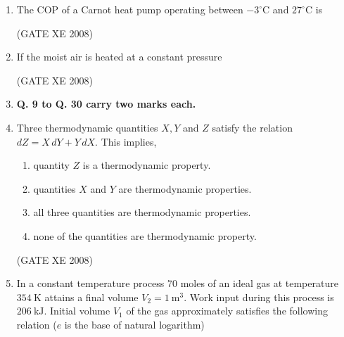 \documentclass[12pt]{article}
\begin{document}
\begin{enumerate}
\item The COP of a Carnot heat pump operating between $-3^\circ\mathrm{C}$ and $27^\circ\mathrm{C}$ is  

\begin{enumerate}
\end{enumerate}

(GATE XE 2008)

\item If the moist air is heated at a constant pressure  

\begin{enumerate}
\end{enumerate}

(GATE XE 2008)

\item[] \textbf{Q. 9 to Q. 30 carry two marks each.}

\item Three thermodynamic quantities $X, Y$ and $Z$ satisfy the relation  
$dZ = X\, dY + Y\, dX.$
This implies,  
\begin{enumerate}
\item  quantity $Z$ is a thermodynamic property.
\item  quantities $X$ and $Y$ are thermodynamic properties. 
\item  all three quantities are thermodynamic properties. 
\item  none of the quantities are thermodynamic property. 
\end{enumerate}

(GATE XE 2008)

\item In a constant temperature process 70 moles of an ideal gas at temperature $354\ \mathrm{K}$ attains a final volume $V_2 = 1\ \mathrm{m^3}$. Work input during this process is $206\ \mathrm{kJ}$. Initial volume $V_1$ of the gas approximately satisfies the following relation ($e$ is the base of natural logarithm)  


\end{enumerate}
\end{document}
